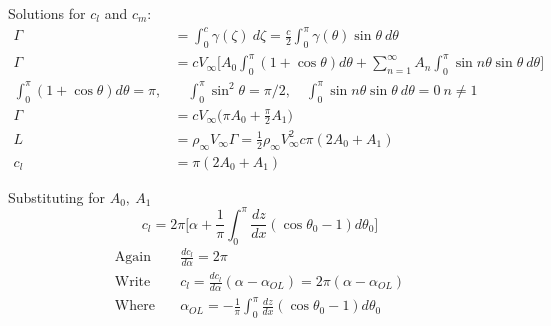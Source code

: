 \documentclass[draft=false, titlepage]{article}
\begin{document}
Solutions for $c_l$ and $c_m$:
\begin{align*}
    \Gamma &= \int_0^c \gamma(\zeta)\ d\zeta = \frac{c}{2} \int_0^\pi \gamma(\theta)\sin\theta\ d\theta\\
    \Gamma &= cV_\infty \Big[ A_0 \int_0^\pi (1+\cos\theta)d\theta + \sum_{n=1}^\infty A_n \int_0^\pi \sin n\theta \sin\theta\ d\theta \Big]\\
    \int_0^\pi (1+\cos\theta) d\theta = \pi,&\quad \int_0^\pi \sin^2\theta = \pi/2,\quad \int_0^\pi \sin n\theta \sin\theta\ d\theta = 0\ n \neq 1\\
    \Gamma &= cV_\infty \big( \pi A_0 + \frac{\pi}{2}A_1\big)\\
    L &= \rho_\infty V_\infty \Gamma = \frac{1}{2}\rho_\infty V_\infty^2 c \pi (2A_0 + A_1)\\
    c_l &= \pi (2A_0 + A_1)
\end{align*}

Substituting for $A_0,\ A_1$
\begin{equation*}
    c_l = 2\pi \Big[ \alpha + \frac{1}{\pi} \int_0^\pi \frac{dz}{dx}(\cos\theta_0 - 1) d\theta_0\Big]
\end{equation*}
\begin{align*}
    \text{Again} &\quad \frac{dc_l}{d\alpha} = 2\pi\\
    \text{Write} &\quad c_l = \frac{dc_l}{d\alpha}(\alpha - \alpha_{OL}) = 2\pi (\alpha - \alpha_{OL})\\
    \text{Where} &\quad \alpha_{OL} = -\frac{1}{\pi} \int_0^\pi \frac{dz}{dx}(\cos\theta_0 - 1) d\theta_0
\end{align*}
\end{document}
